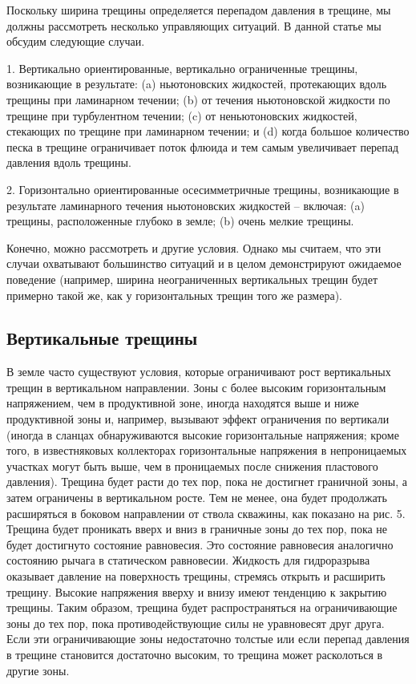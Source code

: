 \documentclass[a4paper, 12pt]{article}
\begin{document}
Поскольку ширина трещины определяется перепадом давления в трещине, мы должны рассмотреть несколько управляющих ситуаций.
В данной статье мы обсудим следующие случаи.

1. Вертикально ориентированные, вертикально ограниченные трещины, возникающие в результате:
(a) ньютоновских жидкостей, протекающих вдоль трещины при ламинарном течении;
(b) от течения ньютоновской жидкости по трещине при турбулентном течении; 
(c) от неньютоновских жидкостей, стекающих по трещине при ламинарном течении;
и (d) когда большое количество песка в трещине ограничивает поток флюида и тем самым увеличивает перепад давления вдоль трещины.

2. Горизонтально ориентированные осесимметричные трещины, возникающие в результате ламинарного течения ньютоновских жидкостей -- включая: (a) трещины, расположенные глубоко в земле; (b) очень мелкие трещины.

Конечно, можно рассмотреть и другие условия.
Однако мы считаем, что эти случаи охватывают большинство ситуаций и в целом демонстрируют ожидаемое поведение
(например, ширина неограниченных вертикальных трещин будет примерно такой же, как у горизонтальных трещин того же размера).

\subsection{Вертикальные трещины}

В земле часто существуют условия, которые ограничивают рост вертикальных трещин в вертикальном направлении.
Зоны с более высоким горизонтальным напряжением, чем в продуктивной зоне, иногда находятся выше и ниже продуктивной зоны и, например, вызывают эффект ограничения по вертикали
(иногда в сланцах обнаруживаются высокие горизонтальные напряжения; кроме того, в известняковых коллекторах горизонтальные напряжения в непроницаемых участках могут быть выше, чем в проницаемых после снижения пластового давления).
Трещина будет расти до тех пор, пока не достигнет граничной зоны, а затем ограничены в вертикальном росте.
Тем не менее, она будет продолжать расширяться в боковом направлении от ствола скважины, как показано на рис. 5.
Трещина будет проникать вверх и вниз в граничные зоны до тех пор, пока не будет достигнуто состояние равновесия.
Это состояние равновесия аналогично состоянию рычага в статическом равновесии.
Жидкость для гидроразрыва оказывает давление на поверхность трещины, стремясь открыть и расширить трещину.
Высокие напряжения вверху и внизу имеют тенденцию к закрытию трещины.
Таким образом, трещина будет распространяться на ограничивающие зоны до тех пор, пока противодействующие силы не уравновесят друг друга.
Если эти ограничивающие зоны недостаточно толстые или если перепад давления в трещине становится достаточно высоким, то трещина может расколоться в другие зоны.
\end{document}
